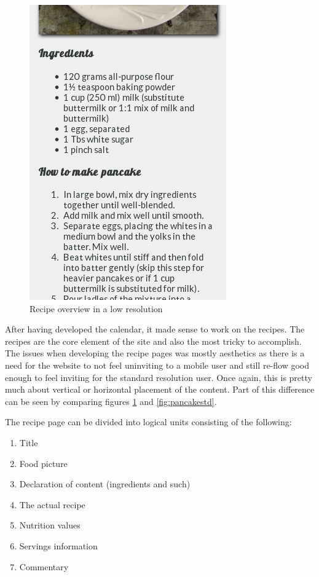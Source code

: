 \documentclass[a4paper]{scrartcl}
\begin{document}
\begin{figure}[!h]
  \begin{center}
    \includegraphics[scale=0.4]{pancakelow2.png}
    \caption{Recipe overview in a low resolution}
    \label{fig:pancakelow}
  \end{center}
\end{figure}

After having developed the calendar, it made sense to work on the recipes. The recipes are the core element of the site and also the most tricky to accomplish.
The issues when developing the recipe pages was mostly aesthetics as there is a need for the website to not feel uninviting to a mobile user and still re-flow good enough to feel inviting for the standard resolution user. Once again, this is pretty much about vertical or horizontal placement of the content. Part of this difference can be seen by comparing figures \ref{fig:pancakelow} and \ref{fig:pancakestd}.

The recipe page can be divided into logical units consisting of the following:

\begin{enumerate}
\item Title
\item Food picture
\item Declaration of content (ingredients and such)
\item The actual recipe
\item Nutrition values
\item Servings information
\item Commentary
\end{enumerate}
\end{document}
